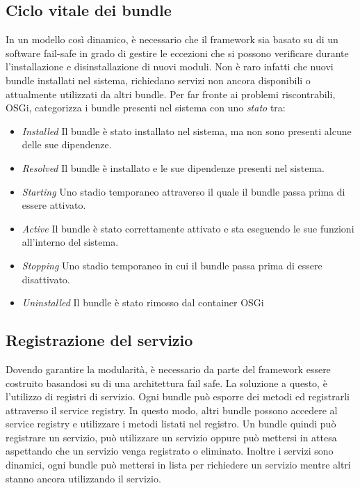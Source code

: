 \subsection{Ciclo vitale dei bundle}\hypertarget{cycle_bundle}{}
In un modello così dinamico, è necessario che il framework sia basato su di un
software fail-safe in grado di gestire le eccezioni che si possono verificare
durante l'installazione e disinstallazione di nuovi moduli.
Non è raro infatti che nuovi bundle installati nel sistema, richiedano servizi
non ancora disponibili o attualmente utilizzati da altri bundle.
Per far fronte ai problemi riscontrabili, OSGi, categorizza i bundle presenti
nel sistema con uno \emph{stato} tra:
\begin{itemize}
        \item   \textit{Installed} Il bundle è stato installato nel sistema, ma
                non sono presenti alcune delle sue dipendenze.
        \item   \textit{Resolved} Il bundle è installato e le sue dipendenze
                presenti nel sistema.
        \item   \textit{Starting} Uno stadio temporaneo attraverso il quale il
                bundle passa prima di essere attivato.
        \item   \textit{Active} Il bundle è stato correttamente attivato e sta
                eseguendo le sue funzioni all'interno del sistema.
        \item   \textit{Stopping} Uno stadio temporaneo in cui il bundle passa
                prima di essere disattivato.
        \item   \textit{Uninstalled} Il bundle è stato rimosso dal container
                OSGi
\end{itemize}
\subsection{Registrazione del servizio}
Dovendo garantire la modularità, è necessario da parte del framework essere
costruito basandosi su di una architettura fail safe. 
La soluzione a questo, è l'utilizzo di registri di servizio. Ogni bundle può
esporre dei metodi ed registrarli attraverso il service registry. In questo
modo, altri bundle possono accedere al service registry e utilizzare i metodi
listati nel registro. Un bundle quindi può registrare un servizio, può
utilizzare un servizio oppure può mettersi in attesa aspettando che un servizio
venga registrato o eliminato.
Inoltre i servizi sono dinamici, ogni bundle può mettersi in lista per
richiedere un servizio mentre altri stanno ancora utilizzando il servizio.

